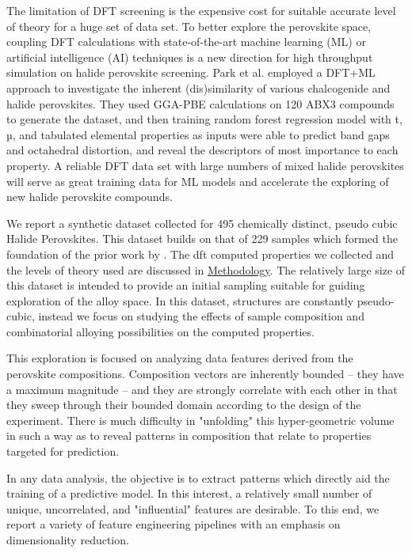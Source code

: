 \documentclass[twoside, twocolumn, 9pt, draft]{article}
\begin{document}
The limitation of DFT screening is the expensive cost for suitable
accurate level of theory for a huge set of data set. To better explore
the perovskite space, coupling DFT calculations with state-of-the-art
machine learning (ML) or artificial intelligence (AI) techniques is a
new direction for high throughput simulation on halide perovskite
screening. Park et al.\cite{RN8} employed a DFT+ML approach to investigate
the inherent (dis)similarity of various chalcogenide and halide
perovskites. They used GGA-PBE calculations on 120 ABX3 compounds to
generate the dataset, and then training random forest regression model
with t, µ, and tabulated elemental properties as inputs were able to
predict band gaps and octahedral distortion, and reveal the
descriptors of most importance to each property. A reliable DFT data
set with large numbers of mixed halide perovskites will serve as great
training data for ML models and accelerate the exploring of new halide
perovskite compounds.

We report a synthetic dataset collected for 495 chemically distinct,
pseudo cubic Halide Perovskites. This dataset builds on that of 229
samples which formed the foundation of the prior work by
\citet{mannodi-kanakkithodi-2022-data-driven}. The \acrfull{dft} computed properties we collected and the levels of theory
used are discussed in \hyperref[sec:org65606f1]{Methodology}. The relatively large size of this
dataset is intended to provide an initial sampling suitable for
guiding exploration of the alloy space. In this dataset, structures
are constantly pseudo-cubic, instead we focus on studying the effects
of sample composition and combinatorial alloying possibilities on the
computed properties.

This exploration is focused on analyzing data features derived from
the perovskite compositions. Composition vectors are inherently
bounded -- they have a maximum magnitude -- and they are strongly
correlate with each other in that they sweep through their bounded
domain according to the design of the experiment. There is much
difficulty in "unfolding" this hyper-geometric volume in such a way as
to reveal patterns in composition that relate to properties targeted
for prediction. 

In any data analysis, the objective is to extract patterns which
directly aid the training of a predictive model. In this interest, a
relatively small number of unique, uncorrelated, and
"influential"\cite{mahoney-2009-cur-matrix} features are desirable. To
this end, we report a variety of feature engineering pipelines with an
emphasis on dimensionality reduction.
\end{document}

